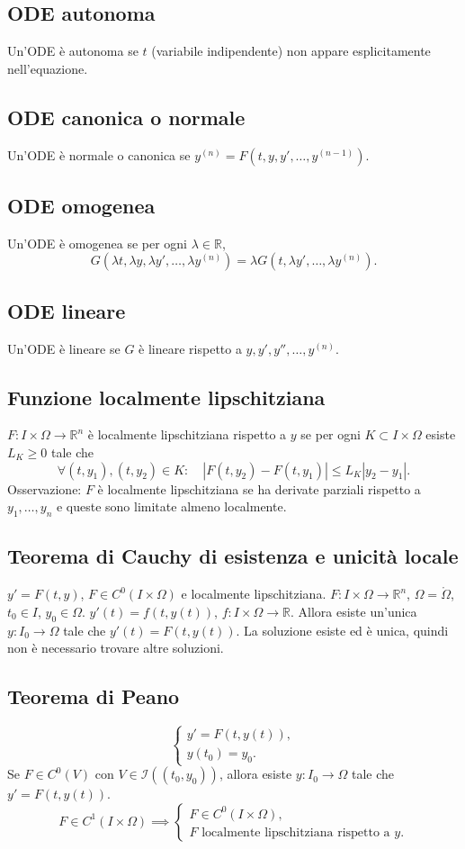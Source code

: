 \documentclass[11pt,a4paper]{article}
\newcommand{\R}{\mathbb R}\newcommand{\N}{\mathbb N}\newcommand{\pagina}[1]{\clearpage}
\begin{document}
\subsection*{ODE autonoma}
Un'ODE è autonoma se $t$ (variabile indipendente) non appare esplicitamente nell'equazione.
\subsection*{ODE canonica o normale}
Un'ODE è normale o canonica se $y^{(n)}=F(t,y,y',\ldots,y^{(n-1)})$.
\pagina{46}
\subsection*{ODE omogenea}
Un'ODE è omogenea se per ogni $\lambda\in\R$,
\[G(\lambda t,\lambda y,\lambda y',\ldots,\lambda y^{(n)})=\lambda G(t,\lambda y',\ldots,\lambda y^{(n)}).\]
\subsection*{ODE lineare}
Un'ODE è lineare se $G$ è lineare rispetto a $y,y',y'',\ldots,y^{(n)}$.
\subsection*{Funzione localmente lipschitziana}
$F:I\times\Omega\to\R^n$ è localmente lipschitziana rispetto a $y$ se per ogni $K\subset I\times\Omega$ esiste $L_K\ge0$ tale che
\[\forall(t,y_1),(t,y_2)\in K:\quad|F(t,y_2)-F(t,y_1)|\le L_K|y_2-y_1|.\]
Osservazione: $F$ è localmente lipschitziana se ha derivate parziali rispetto a $y_1,\ldots,y_n$ e queste sono limitate almeno localmente.
\subsection*{Teorema di Cauchy di esistenza e unicità locale}
$y'=F(t,y)$, $F\in C^0(I\times\Omega)$ e localmente lipschitziana. $F:I\times\Omega\to\R^n$, $\Omega=\mathring\Omega$, $t_0\in I$, $y_0\in\Omega$. $y'(t)=f(t,y(t))$, $f:I\times\Omega\to\R$.
Allora esiste un'unica $y:I_0\to\Omega$ tale che $y'(t)=F(t,y(t))$. La soluzione esiste ed è unica, quindi non è necessario trovare altre soluzioni.
\pagina{47}
\subsection*{Teorema di Peano}
\[\begin{cases}y'=F(t,y(t)),\\y(t_0)=y_0.\end{cases}\]
Se $F\in C^0(V)$ con $V\in\mathcal I((t_0,y_0))$, allora esiste $y:I_0\to\Omega$ tale che $y'=F(t,y(t))$.
\[F\in C^1(I\times\Omega)\implies\begin{cases}F\in C^0(I\times\Omega),\\F\text{ localmente lipschitziana rispetto a }y.\end{cases}\]
\end{document}
